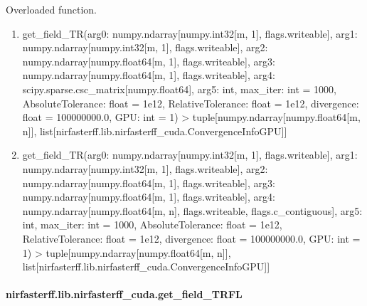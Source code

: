\documentclass[letterpaper,10pt,english]{sphinxmanual}
\begin{document}
\begin{fulllineitems}
\label{\detokenize{_autosummary/nirfasterff.lib.nirfasterff_cuda.get_field_TR:nirfasterff.lib.nirfasterff_cuda.get_field_TR}}
\pysigstartsignatures
{}
\pysigstopsignatures
\sphinxAtStartPar
Overloaded function.
\begin{enumerate}
%
\item {} 
\sphinxAtStartPar
get\_field\_TR(arg0: numpy.ndarray{[}numpy.int32{[}m, 1{]}, flags.writeable{]}, arg1: numpy.ndarray{[}numpy.int32{[}m, 1{]}, flags.writeable{]}, arg2: numpy.ndarray{[}numpy.float64{[}m, 1{]}, flags.writeable{]}, arg3: numpy.ndarray{[}numpy.float64{[}m, 1{]}, flags.writeable{]}, arg4: scipy.sparse.csc\_matrix{[}numpy.float64{]}, arg5: int, max\_iter: int = 1000, AbsoluteTolerance: float = 1e\sphinxhyphen{}12, RelativeTolerance: float = 1e\sphinxhyphen{}12, divergence: float = 100000000.0, GPU: int = \sphinxhyphen{}1) \sphinxhyphen{}\textgreater{} tuple{[}numpy.ndarray{[}numpy.float64{[}m, n{]}{]}, list{[}nirfasterff.lib.nirfasterff\_cuda.ConvergenceInfoGPU{]}{]}

\item {} 
\sphinxAtStartPar
get\_field\_TR(arg0: numpy.ndarray{[}numpy.int32{[}m, 1{]}, flags.writeable{]}, arg1: numpy.ndarray{[}numpy.int32{[}m, 1{]}, flags.writeable{]}, arg2: numpy.ndarray{[}numpy.float64{[}m, 1{]}, flags.writeable{]}, arg3: numpy.ndarray{[}numpy.float64{[}m, 1{]}, flags.writeable{]}, arg4: numpy.ndarray{[}numpy.float64{[}m, n{]}, flags.writeable, flags.c\_contiguous{]}, arg5: int, max\_iter: int = 1000, AbsoluteTolerance: float = 1e\sphinxhyphen{}12, RelativeTolerance: float = 1e\sphinxhyphen{}12, divergence: float = 100000000.0, GPU: int = \sphinxhyphen{}1) \sphinxhyphen{}\textgreater{} tuple{[}numpy.ndarray{[}numpy.float64{[}m, n{]}{]}, list{[}nirfasterff.lib.nirfasterff\_cuda.ConvergenceInfoGPU{]}{]}

\end{enumerate}

\end{fulllineitems}


\sphinxstepscope


\paragraph{nirfasterff.lib.nirfasterff\_cuda.get\_field\_TRFL}
\label{\detokenize{_autosummary/nirfasterff.lib.nirfasterff_cuda.get_field_TRFL:nirfasterff-lib-nirfasterff-cuda-get-field-trfl}}\label{\detokenize{_autosummary/nirfasterff.lib.nirfasterff_cuda.get_field_TRFL::doc}}
\end{document}

